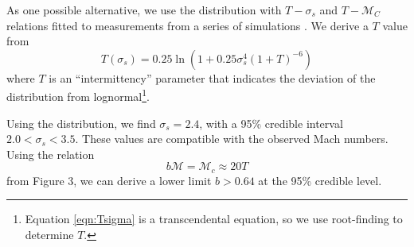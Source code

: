 
As one possible alternative, we use the
\citet{Hopkins2013a} distribution with $T-\sigma_s$ and $T-\mathcal{M}_C$
relations fitted to measurements from a series of simulations
\citep{Kowal2007a,Kritsuk2007a,Schmidt2009a,Federrath2010a,Federrath2012a,Konstandin2012a,Molina2012a}.
We derive a $T$ value from 
\begin{equation} 
    \label{eqn:Tsigma}
    T(\sigma_s) = 0.25 \ln (1+0.25 \sigma_s^4 (1+T)^{-6})
\end{equation}
where $T$ is an ``intermittency'' parameter that indicates the
deviation of the distribution from lognormal\footnote{Equation \ref{eqn:Tsigma}
is a transcendental equation, so we use root-finding to determine $T$.}.  

Using the \citet{Hopkins2013a} distribution, we find $\sigma_s=2.4$, with
a 95\% credible interval $2.0 < \sigma_s < 3.5$.  These values are
compatible with the observed Mach numbers.  Using the relation 
\begin{equation}
    \label{eqn:McMT}
    b \mathcal{M} = \mathcal{M}_c  \approx 20 T
\end{equation}
from \citet{Hopkins2013a} Figure 3, we can derive a lower limit $b>0.64$ at the
95\% credible level.%


% 
% 
% 

